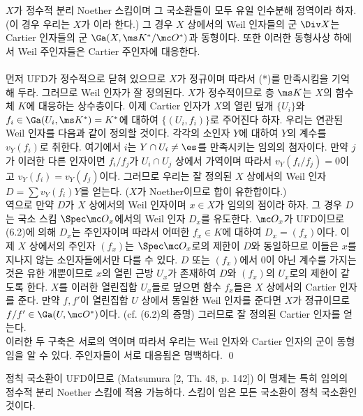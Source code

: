 	
	\begin{proposition}
	$X$가 정수적 분리 Noether 스킴이며 그 국소환들이 모두 유일 인수분해 정역이라 하자.
	(이 경우 우리는 $X$가 이라 한다.)
	그 경우 $X$ 상에서의 Weil 인자들의 군 $\Div X$는 Cartier 인자들의 군 $\Ga(X,\ms K^*/\mc O^*)$과 동형이다.
	또한 이러한 동형사상 하에서 Weil 주인자들은 Cartier 주인자에 대응한다.\\\\
	\pf 먼저 UFD가 정수적으로 닫혀 있으므로 $X$가 정규이며 따라서 (*)를 만족시킴을 기억해 두라.
	그러므로 Weil 인자가 잘 정의된다. $X$가 정수적이므로 층 $\ms K$는 $X$의 함수체 $K$에 대응하는 상수층이다.
	이제 Cartier 인자가 $X$의 열린 덮개 $\{U_i\}$와 $f_i\in\Ga(U_i,\ms K^*)=K^*$에 대하여 $\{(U_i,f_i)\}$로 주어진다 하자.
	우리는 연관된 Weil 인자를 다음과 같이 정의할 것이다. 각각의 소인자 $Y$에 대하여 $Y$의 계수를 $v_Y(f_i)$로 취한다.
	여기에서 $i$는 $Y\cap U_i\ne\es$를 만족시키는 임의의 첨자이다.
	만약 $j$가 이러한 다른 인자이면 $f_i/f_j$가 $U_i\cap U_j$ 상에서 가역이며 따라서 $v_Y(f_i/f_j)=0$이고 $v_Y(f_i)=v_Y(f_j)$이다.
	그러므로 우리는 잘 정의된 $X$ 상에서의 Weil 인자 $D=\sum v_Y(f_i)Y$를 얻는다. ($X$가 Noether이므로 합이 유한합이다.)\\
	역으로 만약 $D$가 $X$ 상에서의 Weil 인자이며 $x\in X$가 임의의 점이라 하자.
	그 경우 $D$는 국소 스킴 $\Spec\mc O_x$에서의 Weil 인자 $D_x$를 유도한다.
	$\mc O_x$가 UFD이므로 (6.2)에 의해 $D_x$는 주인자이며 따라서 어떠한 $f_x\in K$에 대하여 $D_x=(f_x)$이다.
	이제 $X$ 상에서의 주인자 $(f_x)$는 $\Spec\mc O_x$로의 제한이 $D$와 동일하므로
	이들은 $x$를 지나지 않는 소인자들에서만 다를 수 있다.
	$D$ 또는 $(f_x)$에서 0이 아닌 계수를 가지는 것은 유한 개뿐이므로 $x$의 열린 근방 $U_x$가 존재하여
	$D$와 $(f_x)$의 $U_x$로의 제한이 같도록 한다.
	$X$를 이러한 열린집합 $U_x$들로 덮으면 함수 $f_x$들은 $X$ 상에서의 Cartier 인자를 준다.
	만약 $f,f'$이 열린집합 $U$ 상에서 동일한 Weil 인자를 준다면 $X$가 정규이므로 $f/f'\in\Ga(U,\mc O^*)$이다.
	(cf. (6.2)의 증명) 그러므로 잘 정의된 Cartier 인자를 얻는다.\\
	이러한 두 구축은 서로의 역이며 따라서 우리는 Weil 인자와 Cartier 인자의 군이 동형임을 알 수 있다.
	주인자들이 서로 대응됨은 명백하다.
	\qed
	\end{proposition}
	
	
	\begin{remarka}
	정칙 국소환이 UFD이므로 (Matsumura [2, Th. 48, p. 142]) 이 명제는 특히 임의의  정수적 분리 Noether 스킴에 적용 가능하다.
	스킴이 임은 모든 국소환이 정칙 국소환인 것이다.
	\end{remarka}
	
